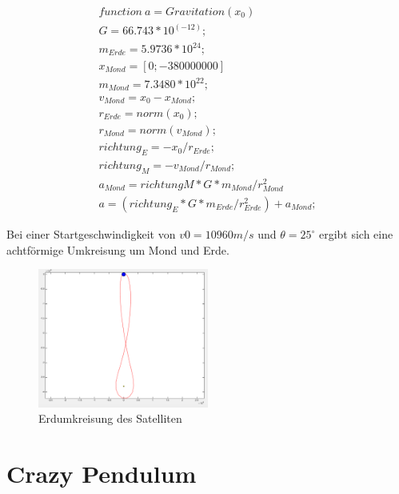 \documentclass[10pt,a4paper]{article}
\begin{document}
\begin{align}
function \:  a = Gravitation(x_0)
\\G = 66.743 * 10^(-12); \nonumber %
\\m_{Erde} = 5.9736 * 10^24; \nonumber%
\\x_{Mond} = [0 ; -380000000] \nonumber%
\\m_{Mond} = 7.3480 * 10^22; \nonumber%
\\v_{Mond} =  x_0 - x_{Mond}; \nonumber%
\\r_{Erde} = norm(x_0); \nonumber%
\\r_{Mond} = norm(v_{Mond}); \nonumber%
\\richtung_E = -x_0 / r_{Erde}; \nonumber%
\\richtung_M = -v_{Mond} / r_{Mond}; \nonumber%
\\a_{Mond} = richtungM * G * m_{Mond} / r_{Mond}^2 \nonumber
\\a = (richtung_E * G * m_{Erde} / r_{Erde}^2) + a_{Mond}; \nonumber%
\end{align}

Bei einer Startgeschwindigkeit von $v0 = 10960 m / s$ und $\theta = 25^\circ$ ergibt sich eine achtförmige Umkreisung um Mond und Erde.

 	\begin{figure}[H]
 		\centering
 		\includegraphics[width=0.5\textwidth]{../aufgabe12/screens/2.png}
 		\caption{Erdumkreisung des Satelliten}
 	\end{figure}

\section{Crazy Pendulum}
\end{document}
